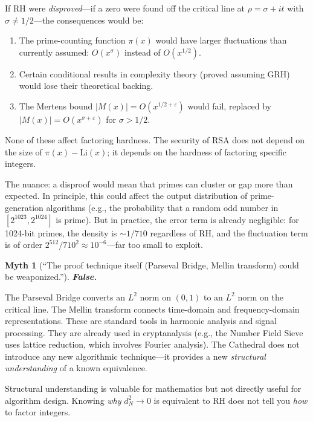 \documentclass[11pt,a4paper]{article}
\theoremstyle{definition}
\theoremstyle{plain}
\newtheorem{myth}{Myth}
\begin{document}
If RH were \emph{disproved}---if a zero were found off the critical
line at $\rho = \sigma + it$ with $\sigma \neq 1/2$---the
consequences would be:

\begin{enumerate}
  \item The prime-counting function $\pi(x)$ would have larger
    fluctuations than currently assumed: $O(x^\sigma)$ instead
    of $O(x^{1/2})$.
  \item Certain conditional results in complexity theory (proved
    assuming GRH) would lose their theoretical backing.
  \item The Mertens bound $|M(x)| = O(x^{1/2+\varepsilon})$ would
    fail, replaced by $|M(x)| = O(x^{\sigma + \varepsilon})$ for
    $\sigma > 1/2$.
\end{enumerate}

None of these affect factoring hardness. The security of RSA does
not depend on the size of $\pi(x) - \text{Li}(x)$; it depends on
the hardness of factoring specific integers.

The nuance: a disproof would mean that primes can cluster or gap
more than expected. In principle, this could affect the output
distribution of prime-generation algorithms (e.g., the probability
that a random odd number in $[2^{1023}, 2^{1024}]$ is prime). But
in practice, the error term is already negligible: for 1024-bit
primes, the density is $\sim 1/710$ regardless of RH, and the
fluctuation term is of order $2^{512}/710^2 \approx 10^{-6}$---far
too small to exploit.

\begin{myth}[``The proof technique itself (Parseval Bridge, Mellin
transform) could be weaponized.'']
\label{myth:technique}
\textbf{False.}
\end{myth}

The Parseval Bridge converts an $L^2$ norm on $(0,1)$ to an $L^2$
norm on the critical line. The Mellin transform connects time-domain
and frequency-domain representations. These are standard tools in
harmonic analysis and signal processing. They are already used in
cryptanalysis (e.g., the Number Field Sieve uses lattice reduction,
which involves Fourier analysis). The Cathedral does not introduce
any new algorithmic technique---it provides a new \emph{structural
understanding} of a known equivalence.

Structural understanding is valuable for mathematics but not
directly useful for algorithm design. Knowing \emph{why} $d_N^2 \to 0$
is equivalent to RH does not tell you \emph{how} to factor integers.
\end{document}
